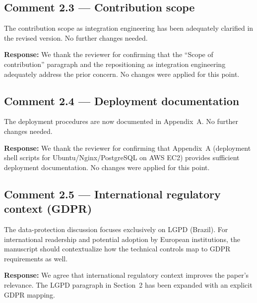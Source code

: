 \documentclass[11pt,a4paper]{article}
\newcommand{\response}[1]{\par\noindent\textcolor{responsecolor}{\textbf{Response:}} #1}
\begin{document}
\bigskip

\subsection*{Comment 2.3 --- Contribution scope}

\begin{reviewerbox}
The contribution scope as integration engineering has been adequately clarified in the revised version. No further changes needed.
\end{reviewerbox}

\response{We thank the reviewer for confirming that the ``Scope of contribution'' paragraph and the repositioning as integration engineering adequately address the prior concern. No changes were applied for this point.}

\bigskip

\subsection*{Comment 2.4 --- Deployment documentation}

\begin{reviewerbox}
The deployment procedures are now documented in Appendix~A. No further changes needed.
\end{reviewerbox}

\response{We thank the reviewer for confirming that Appendix~A (deployment shell scripts for Ubuntu/Nginx/PostgreSQL on AWS EC2) provides sufficient deployment documentation. No changes were applied for this point.}

\bigskip

\subsection*{Comment 2.5 --- International regulatory context (GDPR)}

\begin{reviewerbox}
The data-protection discussion focuses exclusively on LGPD (Brazil). For international readership and potential adoption by European institutions, the manuscript should contextualize how the technical controls map to GDPR requirements as well.
\end{reviewerbox}

\response{We agree that international regulatory context improves the paper's relevance. The LGPD paragraph in Section~2 has been expanded with an explicit GDPR mapping.}
\end{document}
